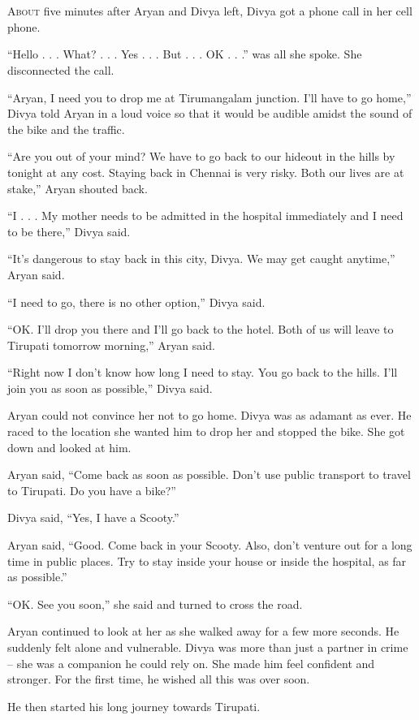 \chapter{}

\lettrine{A}{bout} five minutes after Aryan and Divya left, Divya got a phone call in her
cell phone.

“Hello . . . What? . . . Yes . . . But . . . OK . . .” was all she spoke. She
disconnected the call.

“Aryan, I need you to drop me at Tirumangalam junction. I'll have to go home,”
Divya told Aryan in a loud voice so that it would be audible amidst the sound of
the bike and the traffic.

“Are you out of your mind? We have to go back to our hideout in the hills by
tonight at any cost. Staying back in Chennai is very risky. Both our lives are
at stake,” Aryan shouted back.

“I . . . My mother needs to be admitted in the hospital immediately and I need
to be there,” Divya said.

“It's dangerous to stay back in this city, Divya. We may get caught anytime,”
Aryan said.

“I need to go, there is no other option,” Divya said.

“OK. I'll drop you there and I'll go back to the hotel. Both of us will leave to
Tirupati tomorrow morning,” Aryan said.

“Right now I don't know how long I need to stay. You go back to the hills. I'll
join you as soon as possible,” Divya said.

Aryan could not convince her not to go home. Divya was as adamant as ever. He
raced to the location she wanted him to drop her and stopped the bike. She got
down and looked at him.

Aryan said, “Come back as soon as possible. Don't use public transport to travel
to Tirupati. Do you have a bike?”

Divya said, “Yes, I have a Scooty.”

Aryan said, “Good. Come back in your Scooty. Also, don't venture out for a long
time in public places. Try to stay inside your house or inside the hospital, as
far as possible.”

“OK. See you soon,” she said and turned to cross the road.

Aryan continued to look at her as she walked away for a few more seconds. He
suddenly felt alone and vulnerable. Divya was more than just a partner in crime
– she was a companion he could rely on. She made him feel confident and
stronger. For the first time, he wished all this was over soon.

He then started his long journey towards Tirupati.
